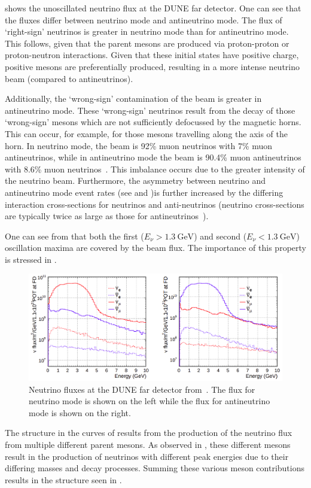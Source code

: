  shows the unoscillated neutrino flux at the DUNE far detector.
One can see that the fluxes differ between neutrino mode and antineutrino mode.
The flux of `right-sign' neutrinos is greater in neutrino mode than for antineutrino mode.
This follows, given that the parent mesons are produced via proton-proton or proton-neutron interactions.
Given that these initial states have positive charge, positive mesons are preferentially produced, resulting in a more intense neutrino beam (compared to antineutrinos).

Additionally, the `wrong-sign' contamination of the beam is greater in antineutrino mode.
These `wrong-sign' neutrinos result from the decay of those `wrong-sign' mesons which are not sufficiently defocussed by the magnetic horns.
This can occur, for example, for those mesons travelling along the axis of the horn.
In neutrino mode, the beam is 92\% muon neutrinos with 7\% muon antineutrinos, while in antineutrino mode the beam is 90.4\% muon antineutrinos with 8.6\% muon neutrinos~\cite{tdrVol2}.
This imbalance occurs due to the greater intensity of the neutrino beam.
Furthermore, the asymmetry between neutrino and antineutrino mode event rates (see  and )is further increased by the differing interaction cross-sections for neutrinos and anti-neutrinos (neutrino cross-sections are typically twice as large as those for antineutrinos~\cite{pdg2020}).

One can see from  that both the first ($E_{\nu} > \SI{1.3}{\giga\electronvolt}$) and second ($E_{\nu} < \SI{1.3}{\giga\electronvolt}$) oscillation maxima are covered by the beam flux.
The importance of this property is stressed in .

\begin{figure}[h]
  \centering
  \includegraphics[width=.95\linewidth]{files/figures/dune_detector/duneFDFlux}
  \caption[Neutrino fluxes at the DUNE far detector.]{Neutrino fluxes at the DUNE far detector from~\cite{tdrVol2}. The flux for neutrino mode is shown on the left while the flux for antineutrino mode is shown on the right.}
  \label{fig:fdFlux}
\end{figure}

The structure in the curves of  results from the production of the neutrino flux from multiple different parent mesons.
As observed in , these different mesons result in the production of neutrinos with different peak energies due to their differing masses and decay processes.
Summing these various meson contributions results in the structure seen in .



